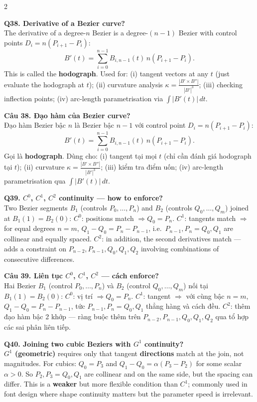 \begin{paracol}{2}
\switchcolumn*

\textbf{Q38. Derivative of a Bezier curve?}\\
The derivative of a degree-$n$ Bezier is a degree-$(n-1)$ Bezier with control points $D_i = n(P_{i+1}-P_i)$:
\[ B'(t) = \sum_{i=0}^{n-1} B_{i,n-1}(t)\, n(P_{i+1}-P_i). \]
This is called the \textbf{hodograph}. Used for: (i) tangent vectors at any $t$ (just evaluate the hodograph at $t$); (ii) curvature analysis $\kappa = \tfrac{|B'\times B''|}{|B'|^3}$; (iii) checking inflection points; (iv) arc-length parametrisation via $\int |B'(t)|\,dt$.

\switchcolumn

\textbf{Câu 38. Đạo hàm của Bezier curve?}\\
Đạo hàm Bezier bậc $n$ là Bezier bậc $n-1$ với control point $D_i = n(P_{i+1}-P_i)$:
\[ B'(t) = \sum_{i=0}^{n-1} B_{i,n-1}(t)\, n(P_{i+1}-P_i). \]
Gọi là \textbf{hodograph}. Dùng cho: (i) tangent tại mọi $t$ (chỉ cần đánh giá hodograph tại $t$); (ii) curvature $\kappa = \tfrac{|B'\times B''|}{|B'|^3}$; (iii) kiểm tra điểm uốn; (iv) arc-length parametrisation qua $\int |B'(t)|\,dt$.

\switchcolumn*

\textbf{Q39. $C^0$, $C^1$, $C^2$ continuity — how to enforce?}\\
Two Bezier segments $B_1$ (controls $P_0,\ldots,P_n$) and $B_2$ (controls $Q_0,\ldots,Q_m$) joined at $B_1(1)=B_2(0)$:
\textbf{$C^0$}: positions match $\Rightarrow Q_0=P_n$.
\textbf{$C^1$}: tangents match $\Rightarrow$ for equal degrees $n=m$, $Q_1-Q_0 = P_n-P_{n-1}$, i.e.\ $P_{n-1}, P_n=Q_0, Q_1$ are collinear and equally spaced.
\textbf{$C^2$}: in addition, the second derivatives match — adds a constraint on $P_{n-2}, P_{n-1}, Q_0, Q_1, Q_2$ involving combinations of consecutive differences.

\switchcolumn

\textbf{Câu 39. Liên tục $C^0$, $C^1$, $C^2$ — cách enforce?}\\
Hai Bezier $B_1$ (control $P_0,\ldots,P_n$) và $B_2$ (control $Q_0,\ldots,Q_m$) nối tại $B_1(1)=B_2(0)$:
\textbf{$C^0$}: vị trí $\Rightarrow Q_0=P_n$.
\textbf{$C^1$}: tangent $\Rightarrow$ với cùng bậc $n=m$, $Q_1-Q_0 = P_n-P_{n-1}$, tức $P_{n-1}, P_n=Q_0, Q_1$ thẳng hàng và cách đều.
\textbf{$C^2$}: thêm đạo hàm bậc 2 khớp — ràng buộc thêm trên $P_{n-2}, P_{n-1}, Q_0, Q_1, Q_2$ qua tổ hợp các sai phân liên tiếp.

\switchcolumn*

\textbf{Q40. Joining two cubic Beziers with $G^1$ continuity?}\\
\textbf{$G^1$ (geometric)} requires only that tangent \textbf{directions} match at the join, not magnitudes. For cubics: $Q_0=P_3$ and $Q_1-Q_0 = \alpha (P_3-P_2)$ for some scalar $\alpha > 0$. So $P_2, P_3=Q_0, Q_1$ are collinear and on the same side, but the spacing can differ. This is a \textbf{weaker} but more flexible condition than $C^1$; commonly used in font design where shape continuity matters but the parameter speed is irrelevant.


\end{paracol}
